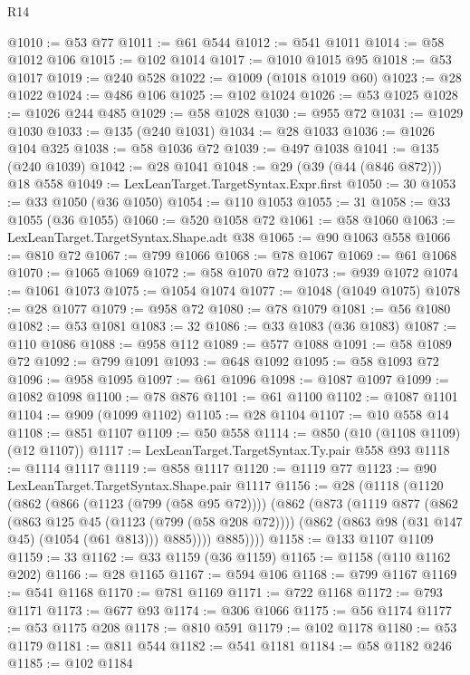\begin{lexlean}{R14}
\begin{coremodule}
@1010 := @53 @77
@1011 := @61 @544
@1012 := @541 @1011
@1014 := @58 @1012 @106
@1015 := @102 @1014
@1017 := @1010 @1015 @95
@1018 := @53 @1017
@1019 := @240 @528
@1022 := @1009 (@1018 @1019 @60)
@1023 := @28 @1022
@1024 := @486 @106
@1025 := @102 @1024
@1026 := @53 @1025
@1028 := @1026 @244 @485
@1029 := @58 @1028
@1030 := @955 @72
@1031 := @1029 @1030
@1033 := @135 (@240 @1031)
@1034 := @28 @1033
@1036 := @1026 @104 @325
@1038 := @58 @1036 @72
@1039 := @497 @1038
@1041 := @135 (@240 @1039)
@1042 := @28 @1041
@1048 := @29 (@39 (@44 (@846 @872))) @18 @558
@1049 := LexLeanTarget.TargetSyntax.Expr.first
@1050 := 30
@1053 := @33 @1050 (@36 @1050)
@1054 := @110 @1053
@1055 := 31
@1058 := @33 @1055 (@36 @1055)
@1060 := @520 @1058 @72
@1061 := @58 @1060
@1063 := LexLeanTarget.TargetSyntax.Shape.adt @38
@1065 := @90 @1063 @558
@1066 := @810 @72
@1067 := @799 @1066
@1068 := @78 @1067
@1069 := @61 @1068
@1070 := @1065 @1069
@1072 := @58 @1070 @72
@1073 := @939 @1072
@1074 := @1061 @1073
@1075 := @1054 @1074
@1077 := @1048 (@1049 @1075)
@1078 := @28 @1077
@1079 := @958 @72
@1080 := @78 @1079
@1081 := @56 @1080
@1082 := @53 @1081
@1083 := 32
@1086 := @33 @1083 (@36 @1083)
@1087 := @110 @1086
@1088 := @958 @112
@1089 := @577 @1088
@1091 := @58 @1089 @72
@1092 := @799 @1091
@1093 := @648 @1092
@1095 := @58 @1093 @72
@1096 := @958 @1095
@1097 := @61 @1096
@1098 := @1087 @1097
@1099 := @1082 @1098
@1100 := @78 @876
@1101 := @61 @1100
@1102 := @1087 @1101
@1104 := @909 (@1099 @1102)
@1105 := @28 @1104
@1107 := @10 @558 @14
@1108 := @851 @1107
@1109 := @50 @558
@1114 := @850 (@10 (@1108 @1109) (@12 @1107))
@1117 := LexLeanTarget.TargetSyntax.Ty.pair @558 @93
@1118 := @1114 @1117
@1119 := @858 @1117
@1120 := @1119 @77
@1123 := @90 LexLeanTarget.TargetSyntax.Shape.pair @1117
@1156 := @28
    (@1118
      (@1120
        (@862
          (@866 (@1123 (@799 (@58 @95 @72))))
          (@862
            (@873
              (@1119
                @877
                (@862
                  (@863 @125 @45 (@1123 (@799 (@58 @208 @72))))
                  (@862 (@863 @98 (@31 @147 @45) (@1054 (@61 @813))) @885))))
            @885))))
@1158 := @133 @1107 @1109
@1159 := 33
@1162 := @33 @1159 (@36 @1159)
@1165 := @1158 (@110 @1162 @202)
@1166 := @28 @1165
@1167 := @594 @106
@1168 := @799 @1167
@1169 := @541 @1168
@1170 := @781 @1169
@1171 := @722 @1168
@1172 := @793 @1171
@1173 := @677 @93
@1174 := @306 @1066
@1175 := @56 @1174
@1177 := @53 @1175 @208
@1178 := @810 @591
@1179 := @102 @1178
@1180 := @53 @1179
@1181 := @811 @544
@1182 := @541 @1181
@1184 := @58 @1182 @246
@1185 := @102 @1184

\end{coremodule}
\end{lexlean}
